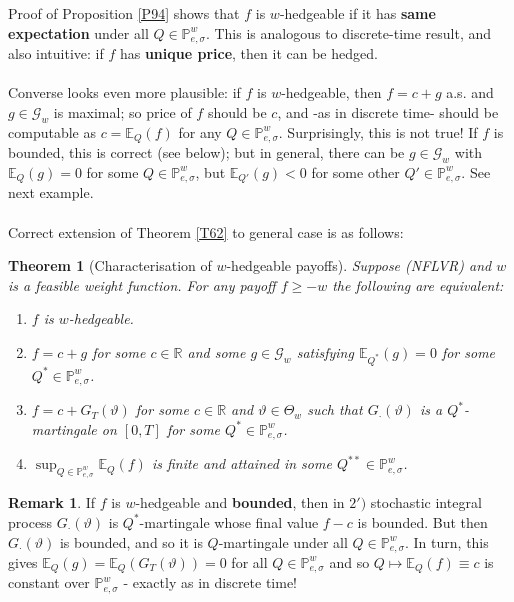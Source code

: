 \documentclass[12pt,a4paper, twoside]{article}
\newtheorem{thm}{Theorem}[section]
\theoremstyle{definition}
\newtheorem{rem}{Remark}[section]
\newcommand{\EE}{\mathbb{E}} %
\newcommand{\PP}{\mathbb{P}} %
\begin{document}
\newpage
Proof of Proposition \ref{P94} shows that $f$ is $w$-hedgeable if it has \textbf{same expectation} under all $Q \in \PP_{e, \sigma}^w$. This is analogous to discrete-time result, and also intuitive: if $f$ has \textbf{unique price}, then it can be hedged. \\\\
Converse looks even more plausible: if $f$ is $w$-hedgeable, then $f=c+g$ a.s. and $g \in \mathcal{G}_w$ is maximal; so price of $f$ should be $c$, and -as in discrete time- should be computable as $c= \EE_Q(f)$ for any $Q \in \PP_{e, \sigma}^w$. Surprisingly, this is not true! If $f$ is bounded, this is correct (see below); but in general, there can be $g \in \mathcal{G}_w$ with $\EE_Q(g)=0$ for some $Q \in \PP_{e, \sigma}^w$, but $\EE_{Q'}(g) <0$ for some other $Q' \in \PP_{e, \sigma}^w$. See next example. \\
\\
Correct extension of Theorem \ref{T62} to general case is as follows:  
\begin{thm}[Characterisation of $w$-hedgeable payoffs] \label{T95} Suppose (NFLVR) and $w$ is a feasible weight function. For any payoff $f \geq -w$ the following are equivalent:
\begin{enumerate}
\item $f$ is $w$-hedgeable.
\item $f=c+g$ for some $c \in \mathbb{R}$ and some $g \in \mathcal{G}_w$ satisfying $\EE_{Q^*} (g)=0$ for some $Q^* \in \PP_{e, \sigma}^w$. 
\item[2'.] $f=c+ G_T( \vartheta)$ for some $c \in \mathbb{R}$ and $\vartheta \in \Theta_w$ such that $G_\cdot( \vartheta)$ is a $Q^*$-martingale on $[0,T]$ for some $Q^* \in \PP_{e, \sigma}^w$. 
\item $\sup_{Q \in \PP_{e, \sigma}^w} \EE_Q(f)$ is finite and attained in some $Q^{**} \in \PP_{e, \sigma}^w$. 
\end{enumerate}
\end{thm}
\begin{rem} If $f$ is $w$-hedgeable and \textbf{bounded}, then in $2')$ stochastic integral process $G_\cdot( \vartheta)$ is $Q^*$-martingale whose final value $f-c$ is bounded. But then $G_\cdot ( \vartheta)$ is bounded, and so it is $Q$-martingale under all $Q \in \PP_{e, \sigma}^w$. In turn, this gives $\EE_Q(g) = \EE_Q(G_T(\vartheta))=0$ for all $Q \in \PP_{e, \sigma}^w$ and so $Q \mapsto \EE_Q(f) \equiv c$ is constant over $\PP_{e, \sigma}^w$ - exactly as in discrete time! 
\end{rem}
\end{document}
